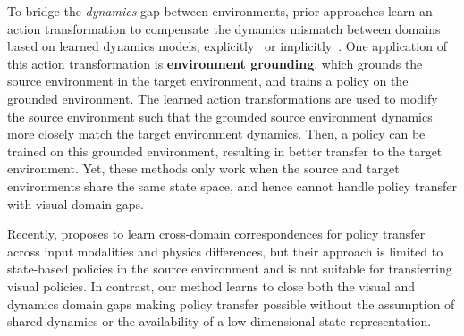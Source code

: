  To bridge the \textit{dynamics} gap between environments, prior approaches learn an action transformation to compensate the dynamics mismatch between domains based on learned dynamics models, explicitly~\citep{hanna2017grounded, desai2020stochastic, Malmir2020Robust} or implicitly~\citep{desai2020imitation, karnan2020reinforced}.
 One application of this action transformation is \textbf{environment grounding}, which grounds the source environment in the target environment, and trains a policy on the grounded environment.  The learned action transformations are used to modify the source environment such that the grounded source environment dynamics more closely match the target environment dynamics.  Then, a policy can be trained on this grounded environment, resulting in better transfer to the target environment. Yet, these methods only work when the source and target environments share the same state space, and hence cannot handle policy transfer with visual domain gaps. 

Recently, \citet{zhang2021learning} proposes to learn cross-domain correspondences for policy transfer across input modalities and physics differences, but their approach is limited to state-based policies in the source environment and is not suitable for transferring visual policies. In contrast, our method learns to close both the visual and dynamics domain gaps making policy transfer possible without the assumption of shared dynamics or the availability of a low-dimensional state representation.
